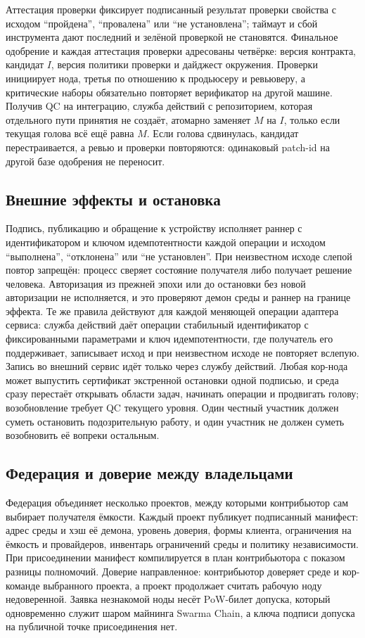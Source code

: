 \documentclass[10pt,a4paper]{article}
\begin{document}
Аттестация проверки фиксирует подписанный результат проверки свойства с исходом ``пройдена'', ``провалена'' или ``не установлена''; таймаут и сбой инструмента дают последний и зелёной проверкой не становятся. Финальное одобрение и каждая аттестация проверки адресованы четвёрке: версия контракта, кандидат $I$, версия политики проверки и дайджест окружения. Проверки инициирует нода, третья по отношению к продьюсеру и ревьюверу, а критические наборы обязательно повторяет верификатор на другой машине. Получив QC на интеграцию, служба действий с репозиторием, которая отдельного пути принятия не создаёт, атомарно заменяет $M$ на $I$, только если текущая голова всё ещё равна $M$. Если голова сдвинулась, кандидат перестраивается, а ревью и проверки повторяются: одинаковый patch-id на другой базе одобрения не переносит.

\subsection{Внешние эффекты и остановка}

Подпись, публикацию и обращение к устройству исполняет раннер с идентификатором и ключом идемпотентности каждой операции и исходом ``выполнена'', ``отклонена'' или ``не установлен''. При неизвестном исходе слепой повтор запрещён: процесс сверяет состояние получателя либо получает решение человека. Авторизация из прежней эпохи или до остановки без новой авторизации не исполняется, и это проверяют демон среды и раннер на границе эффекта. Те же правила действуют для каждой меняющей операции адаптера сервиса: служба действий даёт операции стабильный идентификатор с фиксированными параметрами и ключ идемпотентности, где получатель его поддерживает, записывает исход и при неизвестном исходе не повторяет вслепую. Запись во внешний сервис идёт только через службу действий. Любая кор-нода может выпустить сертификат экстренной остановки одной подписью, и среда сразу перестаёт открывать области задач, начинать операции и продвигать голову; возобновление требует QC текущего уровня. Один честный участник должен суметь остановить подозрительную работу, и один участник не должен суметь возобновить её вопреки остальным.

\subsection{Федерация и доверие между владельцами}

Федерация объединяет несколько проектов, между которыми контрибьютор сам выбирает получателя ёмкости. Каждый проект публикует подписанный манифест: адрес среды и хэш её демона, уровень доверия, формы клиента, ограничения на ёмкость и провайдеров, инвентарь ограничений среды и политику независимости. При присоединении манифест компилируется в план контрибьютора с показом разницы полномочий. Доверие направленное: контрибьютор доверяет среде и кор-команде выбранного проекта, а проект продолжает считать рабочую ноду недоверенной. Заявка незнакомой ноды несёт PoW-билет допуска, который одновременно служит шаром майнинга Swarma Chain, а ключа подписи допуска на публичной точке присоединения нет.
\end{document}
